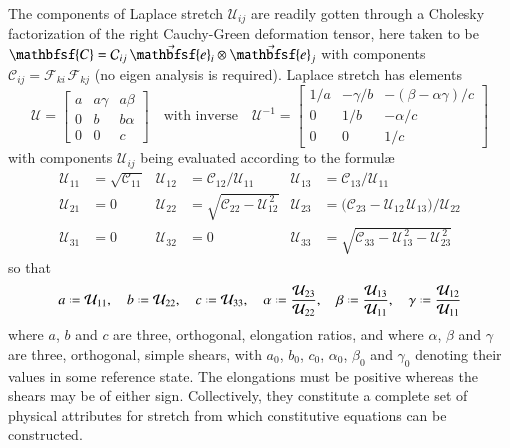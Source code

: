 The components of Laplace stretch $\mathcal{U}_{ij}$ are readily gotten through a Cholesky factorization of the right Cauchy-Green deformation tensor, here taken to be $\mathbfsf{C} = \mathcal{C}_{ij} \, \vec{\mathbfsf{e}}_i \otimes \vec{\mathbfsf{e}}_j$ with components $\mathcal{C}_{ij} = \mathcal{F}_{ki\,} \mathcal{F}_{kj}$ (no eigen analysis is required).  Laplace stretch has elements \cite{Freed17}
\begin{equation} 
\boldsymbol{\mathcal{U}} = 
\begin{bmatrix}
a & a \gamma & a \beta \\ 0 & b & b \alpha \\ 0 & 0 & c
\end{bmatrix} 
\quad \text{with inverse} \quad
\boldsymbol{\mathcal{U}}^{-1} = \begin{bmatrix}
1/a & -\gamma / b & -( \beta - \alpha\gamma ) / c \\
0 & 1/b & -\alpha / c \\
0 & 0 & 1/c
\end{bmatrix}
\label{LaplaceStretch3D}
\end{equation}
with components $\mathcal{U}_{ij}$ being evaluated according to the formul\ae\ \cite{Srinivasa12}
\begin{equation}
\begin{aligned}
\mathcal{U}_{11} & = \sqrt{\mathcal{C}_{11}} & 
\mathcal{U}_{12} & = \mathcal{C}_{12} / \mathcal{U}_{11} &
\mathcal{U}_{13} & = \mathcal{C}_{13} / \mathcal{U}_{11} \\
\mathcal{U}_{21} & = 0 &
\mathcal{U}_{22} & = \sqrt{\mathcal{C}_{22} - \mathcal{U}_{12}^{\,2}} &
\mathcal{U}_{23} & = \bigl( \mathcal{C}_{23} - 
\mathcal{U}_{12\,} \mathcal{U}_{13} \bigr) / \mathcal{U}_{22} \\
\mathcal{U}_{31} & = 0 &
\mathcal{U}_{32} & = 0 & 
\mathcal{U}_{33} & = \sqrt{\mathcal{C}_{33} - \mathcal{U}_{13}^{\,2} - 
    \mathcal{U}_{23}^{\,2}}
\end{aligned}
\label{LagrangianLaplaceStretch3D}
\end{equation}
so that
\begin{equation}
a \defeq \mathcal{U}_{11} , \quad
b \defeq \mathcal{U}_{22} , \quad
c \defeq \mathcal{U}_{33} , \quad
\alpha \defeq \frac{\mathcal{U}_{23}}{\mathcal{U}_{22}} , \quad
\beta \defeq \frac{\mathcal{U}_{13}}{\mathcal{U}_{11}} , \quad
\gamma \defeq \frac{\mathcal{U}_{12}}{\mathcal{U}_{11}}
\label{LagrangianPhysicalAttributes3D}
\end{equation}
where $a$, $b$ and $c$ are three, orthogonal, elongation ratios, and where $\alpha$, $\beta$ and $\gamma$ are three, orthogonal, simple shears, with $a_0$, $b_0$, $c_0$, $\alpha_0$, $\beta_0$ and $\gamma_0$ denoting their values in some reference state. The elongations must be positive whereas the shears may be of either sign. Collectively, they constitute a complete set of physical attributes for stretch from which constitutive equations can be constructed.

